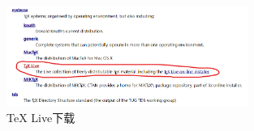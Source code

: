 \begin{figure}[htbp] 
	\centering
	\includegraphics[width=0.7\textwidth]{image/chap01/texlive.png}
	\caption{TeX Live下载}
	\label{fig:texlive}
\end{figure}
